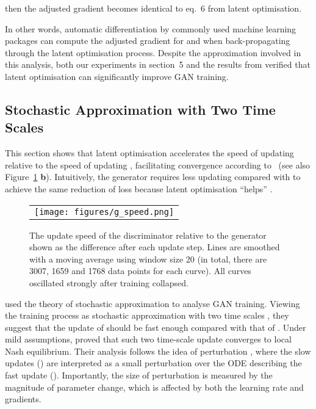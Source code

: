 \documentclass{article} \usepackage{iclr2020_conference,times}
\begin{document}
then the adjusted gradient becomes identical to eq.~6 from latent optimisation.

In other words, automatic differentiation by commonly used machine learning packages can compute the adjusted gradient for  and  when back-propagating through the latent optimisation process.
Despite the approximation involved in this analysis, both our experiments in section~5 and the results from \cite{wu2019deep} verified that latent optimisation can significantly improve GAN training. 

\subsection{Stochastic Approximation with Two Time Scales}
\label{sec:a-stoch-approx}

This section shows that latent optimisation accelerates the speed of updating  relative to the speed of updating , facilitating convergence according to~\citet{heusel2017gans} (see also Figure~\ref{fig:grad-scale-update} \textbf{b}). Intuitively, the generator  requires less updating compared with  to achieve the same reduction of loss because latent optimisation ``helps'' .


\begin{figure}[ht]
    \centering
    \begin{tabular}{c}
    \texttt{[image: figures/g\_speed.png]}
    \end{tabular}
    \caption{The update speed of the discriminator relative to the generator shown as the difference  after each update step. Lines are smoothed with a moving average using window size 20 (in total, there are 3007, 1659 and 1768 data points for each curve). All curves oscillated strongly after training collapsed.}
    \label{fig:grad-scale-update}
\end{figure}


\cite{heusel2017gans} used the theory of stochastic approximation to analyse GAN training. Viewing the training process as stochastic approximation with two time scales \citep{borkar1997stochastic,konda1999actor}, they suggest that the update of  should be fast enough compared with that of . Under mild assumptions, \cite{heusel2017gans} proved that such two time-scale update converges to local Nash equilibrium.
Their analysis follows the idea of  perturbation \citep{hirsch1989convergent}, where the slow updates () are interpreted as a small perturbation over the ODE describing the fast update (). Importantly, the size of perturbation  is measured by the magnitude of parameter change, which is affected by both the learning rate and gradients.
\end{document}
